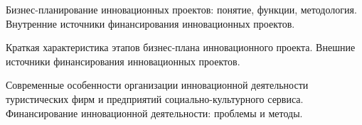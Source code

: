 \documentclass[
	14pt,
	a4paper,
	]
	{scrartcl}
\begin{document}
\vfill

\newpage


\shapk
{}
\setcounter{zad}{0}

\vfill
\z Бизнес-планирование инновационных проектов: понятие, функции, методология.
 \vfill
\z Внутренние источники финансирования инновационных проектов.
 \vfill

\vfill

\newpage


\shapk
{}
\setcounter{zad}{0}

\vfill
\z Краткая характеристика этапов бизнес-плана инновационного проекта.
 \vfill
\z Внешние источники финансирования инновационных проектов.
 \vfill

\vfill

\newpage


\shapk
{}
\setcounter{zad}{0}

\vfill
\z Современные особенности организации инновационной деятельности туристических фирм и предприятий социально-культурного сервиса.
 \vfill
\z Финансирование инновационной деятельности: проблемы и методы.
 \vfill

\vfill

\newpage
\end{document}
